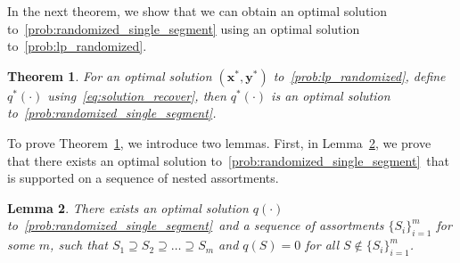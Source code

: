 \documentclass[msom,non-blindrev]{informs3} %
\newtheorem{theorem}{Theorem}
\newtheorem{lemma}[theorem]{Lemma}
\theoremstyle{definition}
\begin{document}
In the next theorem, we show that we can obtain an optimal solution to~\eqref{prob:randomized_single_segment} using an optimal solution to~\eqref{prob:lp_randomized}.

\begin{theorem}\label{thm:lp_randomized_single_segment}
For an optimal solution $(\mathbf{x}^*,\mathbf{y}^*)$ to~\eqref{prob:lp_randomized}, define $q^*(\cdot)$ using~\eqref{eq:solution_recover}, then $q^*(\cdot)$ is an optimal solution to~\eqref{prob:randomized_single_segment}.
\end{theorem}
To prove Theorem~\ref{thm:lp_randomized_single_segment}, we introduce two lemmas. First, in Lemma~\ref{lemma:nested_support}, we prove that there exists an optimal solution to~\eqref{prob:randomized_single_segment}~that is supported on a sequence of nested assortments.

\begin{lemma}\label{lemma:nested_support}
There exists an optimal solution $q(\cdot)$ to~\eqref{prob:randomized_single_segment}~and a sequence of assortments $\{S_i\}_{i=1}^m$ for some $m$, such that $S_1\supseteq S_2\supseteq\dots\supseteq S_m$ and $q(S)=0$ for all $S\notin \{S_i\}_{i=1}^m$.
\end{lemma}
\end{document}
